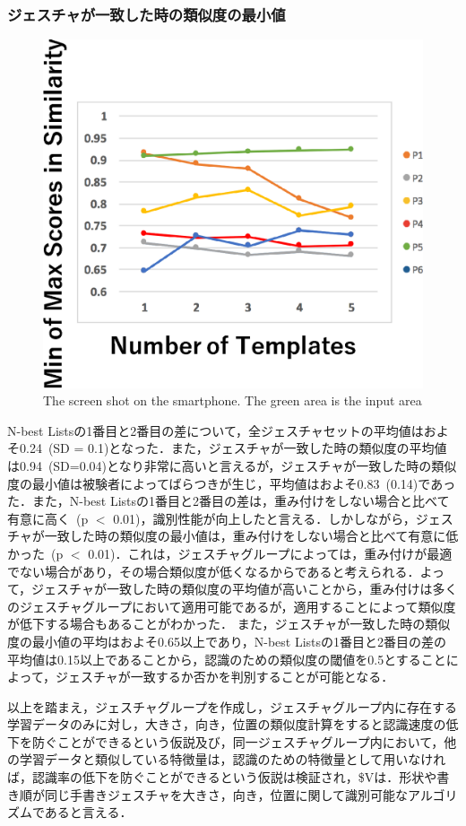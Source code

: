 \subsubsection{ジェスチャが一致した時の類似度の最小値}
\begin{figure}[!h]
\centering
\includegraphics[width=0.7\columnwidth]{img/rec_min.eps}
\caption{The screen shot on the smartphone. The green area is the input area}
\label{fig:rare_rec}
\end{figure}

N-best Listsの1番目と2番目の差について，全ジェスチャセットの平均値はおよそ0.24~(SD = 0.1)となった．また，ジェスチャが一致した時の類似度の平均値は0.94~(SD=0.04)となり非常に高いと言えるが，ジェスチャが一致した時の類似度の最小値は被験者によってばらつきが生じ，平均値はおよそ0.83~(0.14)であった．また，N-best Listsの1番目と2番目の差は，重み付けをしない場合と比べて有意に高く~(p $<$ 0.01)，識別性能が向上したと言える．しかしながら，ジェスチャが一致した時の類似度の最小値は，重み付けをしない場合と比べて有意に低かった~(p $<$ 0.01)．これは，ジェスチャグループによっては，重み付けが最適でない場合があり，その場合類似度が低くなるからであると考えられる．よって，ジェスチャが一致した時の類似度の平均値が高いことから，重み付けは多くのジェスチャグループにおいて適用可能であるが，適用することによって類似度が低下する場合もあることがわかった．
また，ジェスチャが一致した時の類似度の最小値の平均はおよそ0.65以上であり，N-best Listsの1番目と2番目の差の平均値は0.15以上であることから，認識のための類似度の閾値を0.5とすることによって，ジェスチャが一致するか否かを判別することが可能となる．

以上を踏まえ，ジェスチャグループを作成し，ジェスチャグループ内に存在する学習データのみに対し，大きさ，向き，位置の類似度計算をすると認識速度の低下を防ぐことができるという仮説及び，同一ジェスチャグループ内において，他の学習データと類似している特徴量は，認識のための特徴量として用いなければ，認識率の低下を防ぐことができるという仮説は検証され，\$Vは．形状や書き順が同じ手書きジェスチャを大きさ，向き，位置に関して識別可能なアルゴリズムであると言える．
